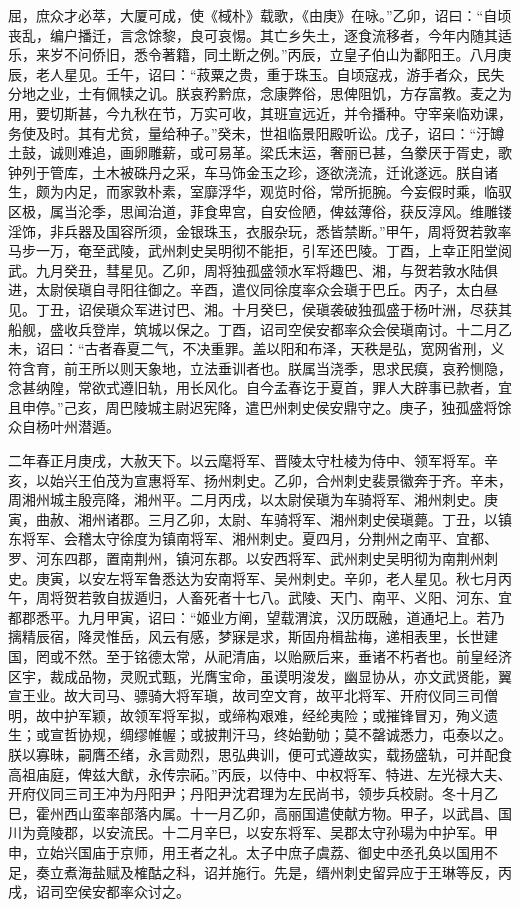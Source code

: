\documentclass[]{article}
\begin{document}
屈，庶众才必萃，大厦可成，使《棫朴》载歌，《由庚》在咏。''乙卯，诏曰：``自顷丧乱，编户播迁，言念馀黎，良可哀惕。其亡乡失土，逐食流移者，今年内随其适乐，来岁不问侨旧，悉令著籍，同土断之例。''丙辰，立皇子伯山为鄱阳王。八月庚辰，老人星见。壬午，诏曰：``菽粟之贵，重于珠玉。自顷寇戎，游手者众，民失分地之业，士有佩犊之讥。朕哀矜黔庶，念康弊俗，思俾阻饥，方存富教。麦之为用，要切斯甚，今九秋在节，万实可收，其班宣远近，并令播种。守宰亲临劝课，务使及时。其有尤贫，量给种子。''癸未，世祖临景阳殿听讼。戊子，诏曰：``汙罇土鼓，诚则难追，画卵雕薪，或可易革。梁氏末运，奢丽已甚，刍豢厌于胥史，歌钟列于管库，土木被硃丹之采，车马饰金玉之珍，逐欲浇流，迁讹遂远。朕自诸生，颇为内足，而家敦朴素，室靡浮华，观览时俗，常所扼腕。今妄假时乘，临驭区极，属当沦季，思闻治道，菲食卑宫，自安俭陋，俾兹薄俗，获反淳风。维雕镂淫饰，非兵器及国容所须，金银珠玉，衣服杂玩，悉皆禁断。''甲午，周将贺若敦率马步一万，奄至武陵，武州刺史吴明彻不能拒，引军还巴陵。丁酉，上幸正阳堂阅武。九月癸丑，彗星见。乙卯，周将独孤盛领水军将趣巴、湘，与贺若敦水陆俱进，太尉侯瑱自寻阳往御之。辛酉，遣仪同徐度率众会瑱于巴丘。丙子，太白昼见。丁丑，诏侯瑱众军进讨巴、湘。十月癸巳，侯瑱袭破独孤盛于杨叶洲，尽获其船舰，盛收兵登岸，筑城以保之。丁酉，诏司空侯安都率众会侯瑱南讨。十二月乙未，诏曰：``古者春夏二气，不决重罪。盖以阳和布泽，天秩是弘，宽网省刑，义符含育，前王所以则天象地，立法垂训者也。朕属当浇季，思求民瘼，哀矜恻隐，念甚纳隍，常欲式遵旧轨，用长风化。自今孟春讫于夏首，罪人大辟事已款者，宜且申停。''己亥，周巴陵城主尉迟宪降，遣巴州刺史侯安鼎守之。庚子，独孤盛将馀众自杨叶州潜遁。

二年春正月庚戌，大赦天下。以云麾将军、晋陵太守杜棱为侍中、领军将军。辛亥，以始兴王伯茂为宣惠将军、扬州刺史。乙卯，合州刺史裴景徽奔于齐。辛未，周湘州城主殷亮降，湘州平。二月丙戌，以太尉侯瑱为车骑将军、湘州刺史。庚寅，曲赦、湘州诸郡。三月乙卯，太尉、车骑将军、湘州刺史侯瑱薨。丁丑，以镇东将军、会稽太守徐度为镇南将军、湘州刺史。夏四月，分荆州之南平、宜都、罗、河东四郡，置南荆州，镇河东郡。以安西将军、武州刺史吴明彻为南荆州刺史。庚寅，以安左将军鲁悉达为安南将军、吴州刺史。辛卯，老人星见。秋七月丙午，周将贺若敦自拔遁归，人畜死者十七八。武陵、天门、南平、义阳、河东、宜都郡悉平。九月甲寅，诏曰：``姬业方阐，望载渭滨，汉历既融，道通圮上。若乃摛精辰宿，降灵惟岳，风云有感，梦寐是求，斯固舟楫盐梅，递相表里，长世建国，罔或不然。至于铭德太常，从祀清庙，以贻厥后来，垂诸不朽者也。前皇经济区宇，裁成品物，灵贶式甄，光膺宝命，虽谟明浚发，幽显协从，亦文武贤能，翼宣王业。故大司马、骠骑大将军瑱，故司空文育，故平北将军、开府仪同三司僧明，故中护军颖，故领军将军拟，或缔构艰难，经纶夷险；或摧锋冒刃，殉义遗生；或宣哲协规，绸缪帷幄；或披荆汗马，终始勤劬；莫不罄诚悉力，屯泰以之。朕以寡昧，嗣膺丕绪，永言勋烈，思弘典训，便可式遵故实，载扬盛轨，可并配食高祖庙庭，俾兹大猷，永传宗祏。''丙辰，以侍中、中权将军、特进、左光禄大夫、开府仪同三司王冲为丹阳尹；丹阳尹沈君理为左民尚书，领步兵校尉。冬十月乙巳，霍州西山蛮率部落内属。十一月乙卯，高丽国遣使献方物。甲子，以武昌、国川为竟陵郡，以安流民。十二月辛巳，以安东将军、吴郡太守孙瑒为中护军。甲申，立始兴国庙于京师，用王者之礼。太子中庶子虞荔、御史中丞孔奂以国用不足，奏立煮海盐赋及榷酤之科，诏并施行。先是，缙州刺史留异应于王琳等反，丙戌，诏司空侯安都率众讨之。
\end{document}
